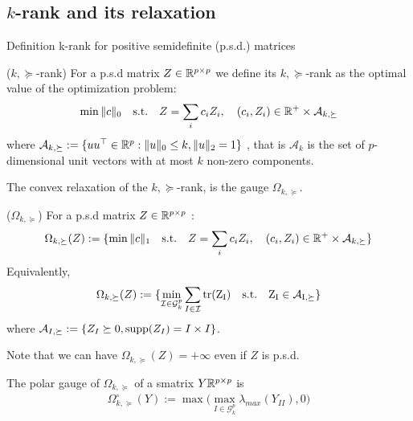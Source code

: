\subsection{$k$-rank and its relaxation}
\label{subsec:norm}

Definition k-rank for positive semidefinite (p.s.d.) matrices
\begin{mydef}
($k,\succeq$-rank) For a p.s.d  matrix $Z\in\mathbb{R}^{p\times p}$  we define its $k,\succeq$-rank as the optimal
value of the optimization problem:
\begin{align}
\min \|c\|_0 \quad \text{s.t.} \quad Z=\sum_{i} c_i Z_i, \quad (c_i,Z_i)\in \mathbb{R}^{+}\times\mathcal{A}_{k,\succeq}
\end{align}
where  $\mathcal{A}_{k,\succeq}:=\{u u^\top \in\mathbb{R}^p  :   \|u\|_0 \leq k, \|u\|_2 = 1\}$ , that is $\mathcal{A}_k$ is the set of $p$-dimensional unit vectors with at most $k$ non-zero components.
\end{mydef}

The convex relaxation of the $k,\succeq$-rank, is the gauge $\Omega_{k,\succeq}$. 

\begin{mydef}
($\Omega_{k,\succeq}$) For a p.s.d  matrix $Z\in\mathbb{R}^{p\times p}$  :
\begin{align}
\Omega_{k,\succeq}(Z):=\{\min \|c\|_1 \quad \text{s.t.} \quad Z=\sum_{i} c_i Z_i, \quad (c_i,Z_i)\in \mathbb{R}^{+}\times\mathcal{A}_{k,\succeq}\}
\end{align}
Equivalently, 
\begin{align}
\Omega_{k,\succeq}(Z):=\{\min_{\mathcal{I}\in\mathcal{G}^p_k} \sum_{I\in\mathcal{I}}\rm tr(Z_I) \quad \text{s.t.} \quad Z_I\in\mathcal{A}_{I,\succeq}\}
\end{align}
where  $\mathcal{A}_{I,\succeq}:=\{Z_I\succeq 0 ,\text{supp}(Z_I)=I\times I\}$.
\end{mydef}

Note that we can have $\Omega_{k,\succeq}(Z)=+\infty$ even if $Z$ is p.s.d.

\begin{lemm} The polar gauge of $\Omega_{k,\succeq}$ of a smatrix $Y\mathbb{R}^{p\times p}$ is
\begin{align}
\Omega_{k,\succeq}^{\circ}(Y):= \max\big(\max_{I\in\mathcal{G}^p_k}\lambda_{max}(Y_{II}),0\big)
\end{align}
\end{lemm}

